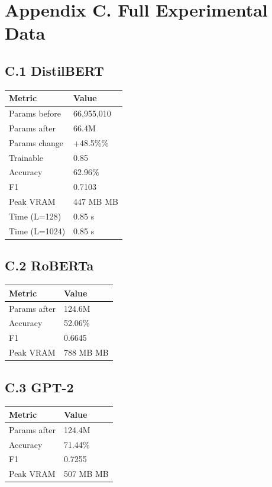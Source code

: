 \section{Appendix C. Full Experimental Data}

\subsection{C.1 DistilBERT}

\begin{table}[H]
\centering
\small
\begin{tabular}{ll}
\toprule
\textbf{Metric} & \textbf{Value} \\
\midrule
Params before & 66,955,010 \\
Params after & 66.4M \\
Params change & +48.5\%\% \\
Trainable & 0.85 \\
Accuracy & 62.96\% \\
F1 & 0.7103 \\
Peak VRAM & 447 MB MB \\
Time (L=128) & 0.85 s \\
Time (L=1024) & 0.85 s \\
\bottomrule
\end{tabular}
\end{table}

\subsection{C.2 RoBERTa}

\begin{table}[H]
\centering
\small
\begin{tabular}{ll}
\toprule
\textbf{Metric} & \textbf{Value} \\
\midrule
Params after & 124.6M \\
Accuracy & 52.06\% \\
F1 & 0.6645 \\
Peak VRAM & 788 MB MB \\
\bottomrule
\end{tabular}
\end{table}

\subsection{C.3 GPT-2}

\begin{table}[H]
\centering
\small
\begin{tabular}{ll}
\toprule
\textbf{Metric} & \textbf{Value} \\
\midrule
Params after & 124.4M \\
Accuracy & 71.44\% \\
F1 & 0.7255 \\
Peak VRAM & 507 MB MB \\
\bottomrule
\end{tabular}
\end{table}

